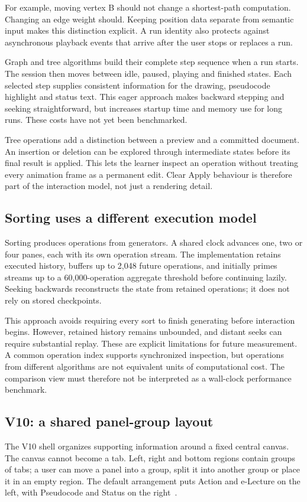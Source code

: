 \documentclass[11pt,a4paper]{article}
\newcommand{\page}{\par\penalty0 \ifdim\pagetotal>.72\textheight\clearpage\else\vspace{8pt}\fi}
\begin{document}
For example, moving vertex B should not change a shortest-path computation. Changing an edge weight should. Keeping position data separate from semantic input makes this distinction explicit. A run identity also protects against asynchronous playback events that arrive after the user stops or replaces a run.

Graph and tree algorithms build their complete step sequence when a run starts. The session then moves between idle, paused, playing and finished states. Each selected step supplies consistent information for the drawing, pseudocode highlight and status text. This eager approach makes backward stepping and seeking straightforward, but increases startup time and memory use for long runs. These costs have not yet been benchmarked.

Tree operations add a distinction between a preview and a committed document. An insertion or deletion can be explored through intermediate states before its final result is applied. This lets the learner inspect an operation without treating every animation frame as a permanent edit. Clear Apply behaviour is therefore part of the interaction model, not just a rendering detail.

\subsection{Sorting uses a different execution model}
Sorting produces operations from generators. A shared clock advances one, two or four panes, each with its own operation stream. The implementation retains executed history, buffers up to 2,048 future operations, and initially primes streams up to a 60,000-operation aggregate threshold before continuing lazily. Seeking backwards reconstructs the state from retained operations; it does not rely on stored checkpoints.

This approach avoids requiring every sort to finish generating before interaction begins. However, retained history remains unbounded, and distant seeks can require substantial replay. These are explicit limitations for future measurement. A common operation index supports synchronized inspection, but operations from different algorithms are not equivalent units of computational cost. The comparison view must therefore not be interpreted as a wall-clock performance benchmark.

\page
\subsection{V10: a shared panel-group layout}\label{sec:v10}
The V10 shell organizes supporting information around a fixed central canvas. The canvas cannot become a tab. Left, right and bottom regions contain groups of tabs; a user can move a panel into a group, split it into another group or place it in an empty region. The default arrangement puts Action and e-Lecture on the left, with Pseudocode and Status on the right~\cite{architecture}.
\end{document}
